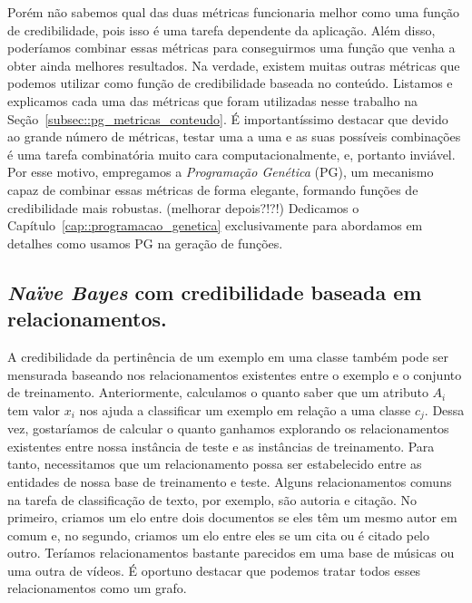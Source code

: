     Porém não sabemos qual das duas métricas funcionaria melhor como uma função de credibilidade, pois isso é uma tarefa dependente da aplicação. Além disso, poderíamos combinar essas métricas para conseguirmos uma função que venha a obter ainda melhores resultados. Na verdade, existem muitas outras métricas que podemos utilizar como função de credibilidade baseada no conteúdo. Listamos e explicamos cada uma das métricas que foram utilizadas nesse trabalho na Seção~\ref{subsec::pg_metricas_conteudo}. É importantíssimo destacar que devido ao grande número de métricas, testar uma a uma e as suas possíveis combinações é uma tarefa combinatória muito cara computacionalmente, e, portanto inviável. Por esse motivo, empregamos a \textit{Programação Genética} (PG), um mecanismo capaz de combinar essas métricas de forma elegante, formando funções de credibilidade mais robustas. (melhorar depois?!?!) Dedicamos o Capítulo~\ref{cap::programacao_genetica} exclusivamente para abordamos em detalhes como usamos PG na geração de funções.


\subsection{\textit{Naïve Bayes} com credibilidade baseada em relacionamentos.}
\label{subsubsec::nbcredgrafos}

A credibilidade da pertinência de um exemplo em uma classe também pode ser mensurada baseando nos relacionamentos existentes entre o exemplo e o conjunto de treinamento. Anteriormente, calculamos o quanto saber que um atributo $A_i$ tem valor $x_i$ nos ajuda a classificar um exemplo em relação a uma classe $c_j$. Dessa vez, gostaríamos de calcular o quanto ganhamos explorando os relacionamentos existentes entre nossa instância de teste e as instâncias de treinamento. Para tanto, necessitamos que um relacionamento possa ser estabelecido entre as entidades de nossa base de treinamento e teste. Alguns relacionamentos comuns na tarefa de classificação de texto, por exemplo, são autoria e citação. No primeiro, criamos um elo entre dois documentos se eles têm um mesmo autor em comum e, no segundo, criamos um elo entre eles se um cita ou é citado pelo outro. Teríamos relacionamentos bastante parecidos em uma base de músicas ou uma outra de vídeos. É oportuno destacar que podemos tratar todos esses relacionamentos como um grafo.

